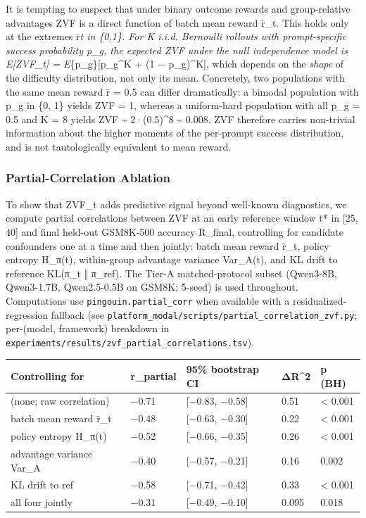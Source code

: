 \documentclass[
  american,
  11pt,
  a4paper,
  oneside]{report}
\newcounter{none} %
\begin{document}
It is tempting to suspect that under binary outcome rewards and
group-relative advantages ZVF is a direct function of batch mean reward
r̄\_t. This holds only at the extremes r̄\emph{t in \{0,1\}. For K i.i.d.
Bernoulli rollouts with prompt-specific success probability p\_g, the
expected ZVF under the null independence model is E{[}ZVF\_t{]} =
E}\{p\_g\}{[}p\_g\^{}K + (1 − p\_g)\^{}K{]}, which depends on the
\emph{shape} of the difficulty distribution, not only its mean.
Concretely, two populations with the same mean reward r̄ = 0.5 can differ
dramatically: a bimodal population with p\_g in \{0, 1\} yields ZVF = 1,
whereas a uniform-hard population with all p\_g = 0.5 and K = 8 yields
ZVF \textasciitilde{} 2·(0.5)\^{}8 \textasciitilde{} 0.008. ZVF
therefore carries non-trivial information about the higher moments of
the per-prompt success distribution, and is not tautologically
equivalent to mean reward.

\subsubsection{Partial-Correlation
Ablation}\label{partial-correlation-ablation}

To show that ZVF\_t adds predictive signal beyond well-known
diagnostics, we compute partial correlations between ZVF at an early
reference window t* in {[}25, 40{]} and final held-out GSM8K-500
accuracy R\_final, controlling for candidate confounders one at a time
and then jointly: batch mean reward r̄\_t, policy entropy H\_π(t),
within-group advantage variance Var\_A(t), and KL drift to reference
KL(π\_t ‖ π\_ref). The Tier-A matched-protocol subset (Qwen3-8B,
Qwen3-1.7B, Qwen2.5-0.5B on GSM8K; 5-seed) is used throughout.
Computations use \texttt{pingouin.partial\_corr} when available with a
residualized-regression fallback (see
\texttt{platform_modal/scripts/partial\_correlation\_zvf.py}; per-(model, framework)
breakdown in
\texttt{experiments/results/zvf\_partial\_correlations.tsv}).

{\def\LTcaptype{none} %
\begin{longtable}[]{@{}lllll@{}}
\toprule\noalign{}
Controlling for & r\_partial & 95\% bootstrap CI & ΔR\^{}2 & p (BH) \\
\midrule\noalign{}
\endhead
\bottomrule\noalign{}
\endlastfoot
(none; raw correlation) & −0.71 & {[}−0.83, −0.58{]} & 0.51 &
\textless{} 0.001 \\
batch mean reward r̄\_t & −0.48 & {[}−0.63, −0.30{]} & 0.22 & \textless{}
0.001 \\
policy entropy H\_π(t) & −0.52 & {[}−0.66, −0.35{]} & 0.26 & \textless{}
0.001 \\
advantage variance Var\_A & −0.40 & {[}−0.57, −0.21{]} & 0.16 & 0.002 \\
KL drift to ref & −0.58 & {[}−0.71, −0.42{]} & 0.33 & \textless{}
0.001 \\
all four jointly & −0.31 & {[}−0.49, −0.10{]} & 0.095 & 0.018 \\
\end{longtable}
}
\end{document}
